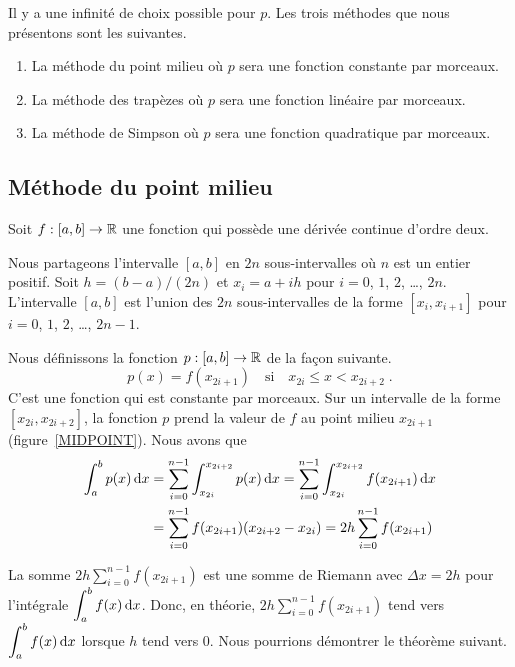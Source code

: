 {Il y a une infinité de choix possible pour $p$.  Les trois méthodes
que nous présentons sont les suivantes.
\begin{enumerate}
\item La méthode du point milieu où $p$ sera une fonction constante
par morceaux.
\item La méthode des trapèzes où $p$ sera une fonction linéaire par
morceaux.
\item La méthode de Simpson où $p$ sera une fonction quadratique par
morceaux.
\end{enumerate}

\subsection{Méthode du point milieu}

Soit $f:[a,b]\rightarrow \mathbb{R}$ une fonction qui possède une dérivée
continue d'ordre deux.

Nous partageons l'intervalle $[a,b]$ en $2n$ sous-intervalles
où $n$ est un entier positif.  Soit $h = (b-a)/(2n)$ et $x_i = a + i h$
pour $i=0$, $1$, $2$, \ldots, $2n$.  L'intervalle $[a,b]$ est l'union
des $2n$ sous-intervalles de la forme $[x_i,x_{i+1}]$ pour $i=0$, $1$,
$2$, \ldots, $2n-1$.

Nous définissons la fonction $p:[a,b] \rightarrow \mathbb{R}$ de la façon suivante.
\[
p(x) = f(x_{2i+1})  \quad \text{si} \quad x_{2i} \leq x < x_{2i+2} \; .
\]
C'est une fonction qui est constante par morceaux.  Sur un intervalle
de la forme $[x_{2i},x_{2i+2}]$, la fonction $p$ prend la valeur de
$f$ au point milieu $x_{2i+1}$ (figure~\ref{MIDPOINT}).  Nous avons que
\begin{align*}
\int_a^b p(x) \,\mathrm{d}x
&= \sum_{i=0}^{n-1} \int_{x_{2i}}^{x_{2i+2}} p(x) \,\mathrm{d}x 
= \sum_{i=0}^{n-1} \int_{x_{2i}}^{x_{2i+2}} f(x_{2i+1}) \,\mathrm{d}x \\
&= \sum_{i=0}^{n-1} f(x_{2i+1}) (x_{2i+2} - x_{2i})
= 2h \sum_{i=0}^{n-1} f(x_{2i+1})
\end{align*}


La somme
$\displaystyle 2h \sum_{i=0}^{n-1} f(x_{2i+1})$ est une somme de
Riemann avec $\Delta x = 2h$ pour l'intégrale
$\displaystyle \int_a^b f(x) \,\mathrm{d}x$.  Donc, en théorie,
$\displaystyle 2h \sum_{i=0}^{n-1} f(x_{2i+1})$ tend vers
$\displaystyle \int_a^b f(x) \,\mathrm{d}x$ lorsque $h$ tend vers $0$.  Nous
pourrions démontrer le théorème suivant.

}
